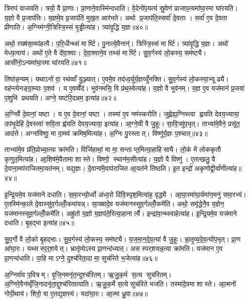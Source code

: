 त्रिरुप॑ वाजयति। त्रयो॒ वै प्रा॒णाः। प्रा॒णाने॒वास्मि॑न्दधाति। वे॒देनो॑प॒यत्य॑ स्रु॒वेण॑ प्राजाप॒त्यमा॑घा॒रमा घा॑रयति। य॒ज्ञो वै प्र॒जाप॑तिः। य॒ज्ञमे॒व प्र॒जाप॑तिं मुख॒त आर॑भते। अथो प्र॒जाप॑ति॒स्सर्वा॑ दे॒वताः। सर्वा॑ ए॒व दे॒वता प्रीणाति। अ॒ग्निम॑ग्नी॒त्रिस्त्रि॒स्सं मृ॒ड्ढीत्या॑ह। त्र्या॑वृ॒द्धि य॒ज्ञः॥४०॥

अथो॒ रख्ष॑सा॒मप॑हत्यै। प॒रि॒धीन्थ्सं मार्ष्टि। पु॒नात्ये॒वैनान्॑। त्रिस्त्रि॒स्सं मार्ष्टि। त्र्या॑वृ॒द्धि य॒ज्ञः। अथो॑ मेध्य॒त्वाय॑। अथो॑ ए॒ते वै दे॑वा॒श्वाः। दे॒वा॒श्वाने॒व तथ्सं मार्ष्टि। सु॒व॒र्गस्य॑ लो॒कस्य॒ सम॑ष्ट्यै। आसी॑नो॒ऽन्यमा॑घा॒रमा घा॑रयति॥४१॥

तिष्ठ॑न्न॒न्यम्। यथाऽनो॑ वा॒ रथ॑व्वाँ यु॒ञ्ज्यात्। ए॒वमे॒व तद॑ध्व॒र्युर्य॒ज्ञय्युँ॑नक्ति। सु॒व॒र्गस्य॑ लो॒कस्या॒भ्यूढ्यै। वह॑न्त्येनङ्ग्रा॒म्याः प॒शव॑। य ए॒वव्वेँद॑। भुव॑नमसि॒ वि प्र॑थ॒स्वेत्या॑ह। य॒ज्ञो वै भुव॑नम्। य॒ज्ञ ए॒व यज॑मानं प्र॒जया॑ प॒शुभि॑ प्रथयति। अग्ने॒ यष्ट॑रि॒दन्नम॒ इत्या॑ह॥४२॥

अ॒ग्निर्वै दे॒वानां॒ यष्टा। य ए॒व दे॒वानां॒ यष्टा। तस्मा॑ ए॒व नम॑स्करोति। जुह्वेह्य॒ग्निस्त्वा ह्वयति देवय॒ज्याया॒ उप॑भृ॒देहि॑ दे॒वस्त्वा॑ सवि॒ता ह्व॑यति देवय॒ज्याया॒ इत्या॑ह। आ॒ग्ने॒यी वै जु॒हूः। सा॒वि॒त्र्यु॑प॒भृत्। ताभ्या॑मे॒वैने॒ प्रसू॑त॒ आद॑त्ते। अग्ना॑विष्णू॒ मा वा॒मव॑ क्रमिष॒मित्या॑ह। अ॒ग्निः पु॒रस्तात्। विष्णु॑र्य॒ज्ञः प॒श्चात्॥४३॥

ताभ्या॑मे॒व प्र॑ति॒प्रोच्या॒त्या क्रा॑मति। विजि॑हाथां॒ मा मा॒ सन्ताप्त॒मित्या॒हाहिसायै। लो॒कं मे॑ लोककृतौ कृणुत॒मित्या॑ह। आ॒शिष॑मे॒वैतामा शास्ते। विष्णो॒ स्थान॑म॒सीत्या॑ह। य॒ज्ञो वै विष्णु॑। ए॒तत्खलु॒ वै दे॒वाना॒मप॑राजितमा॒यत॑नम्। यद्य॒ज्ञः। दे॒वाना॑मे॒वाप॑राजित आ॒यत॑ने तिष्ठति। इ॒त इन्द्रो॑ अकृणोद्वी॒र्या॑णीत्या॑ह॥४४॥

इ॒न्द्रि॒यमे॒व यज॑माने दधाति। स॒मा॒रभ्यो॒र्ध्वो अ॑ध्व॒रो दि॑वि॒स्पृश॒मित्या॑ह॒ वृद्ध्यै। आ॒घा॒रमा॑घा॒र्यमा॑ण॒मनु॑ समा॒रभ्य॑। ए॒तस्मि॑न्का॒ले दे॒वास्सु॑व॒र्गल्लोँ॒कमा॑यन्न्। सा॒ख्षादे॒व यज॑मानस्सुव॒र्गल्लोँ॒कमे॑ति। अथो॒ समृ॑द्धेनै॒व य॒ज्ञेन॒ यज॑मानस्सुव॒र्गल्लोँ॒कमे॑ति। अह्रु॑तो य॒ज्ञो य॒ज्ञप॑ते॒रित्या॒हानार्त्यै। इन्द्रा॑वा॒न्थ्स्वाहेत्या॑ह। इ॒न्द्रि॒यमे॒व यज॑माने दधाति। बृ॒हद्भा इत्या॑ह॥४५॥

सु॒व॒र्गो वै लो॒को बृ॒हद्भाः। सु॒व॒र्गस्य॑ लो॒कस्य॒ सम॑ष्ट्यै। य॒ज॒मा॒न॒दे॒व॒त्या॑ वै जु॒हूः। भ्रा॒तृ॒व्य॒दे॒व॒त्यो॑प॒भृत्। प्रा॒ण आ॑घा॒रः। यथ्सस्प॒र्॒शयेत्। भ्रातृ॑व्येऽस्य प्रा॒णन्द॑ध्यात्। असस्पर्‌शयन्न॒त्या क्रा॑मति। यज॑मान ए॒व प्रा॒णन्द॑धाति। पा॒हि माऽग्ने॒ दुश्च॑रिता॒दा मा॒ सुच॑रिते भ॒जेत्या॑ह॥४६॥

अ॒ग्निर्वाव प॒वित्रम्। वृ॒जि॒नमनृ॑त॒न्दुश्च॑रितम्। ऋ॒जु॒क॒र्म स॒त्य सुच॑रितम्। अ॒ग्निरे॒वैन॑व्वृँजि॒नादनृ॑ता॒द्दुश्च॑रितात्पाति। ऋ॒जु॒क॒र्मे स॒त्ये सुच॑रिते भजति। तस्मा॑दे॒वमा शास्ते। आ॒त्मनो॑ गोपी॒थाय॑। शिरो॒ वा ए॒तद्य॒ज्ञस्य॑। यदा॑घा॒रः। आ॒त्मा ध्रु॒वा॥४७॥

